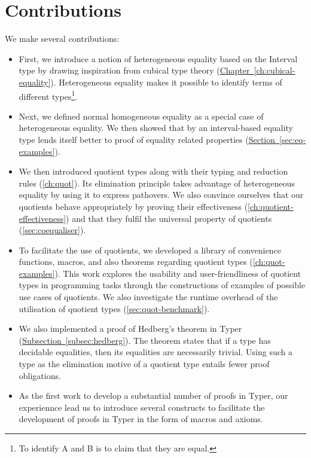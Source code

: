 \documentclass[12pt,twoside,maitrise]{dms}
\theoremstyle{definition}
\numberwithin{equation}{section}
\numberwithin{table}{chapter}
\numberwithin{figure}{chapter}
\begin{document}
\section{Contributions}

We make several contributions:

\begin{itemize}
  \item{First, we introduce a notion of heterogeneous equality based on the
    Interval type by drawing inspiration from cubical type theory
    (\hyperref[ch:cubical-equality]{Chapter~\ref*{ch:cubical-equality}}).
    Heterogeneous equality makes it possible to identify terms of different
    types\footnote{To identify A and B is to claim that they are equal.}. }

  \item{Next, we defined normal homogeneous equality as a special case of
    heterogeneous equality. We then showed that by an interval-based equality
    type lends itself better to proof of equality related properties
    (\hyperref[sec:eq-examples]{Section~\ref*{sec:eq-examples}}).}

  \item{We then introduced quotient types along with their typing and reduction
    rules (\autoref{ch:quot}). Its elimination principle takes advantage of
    heterogeneous equality by using it to express
    pathovers\cite{licata2015cubical}. We also convince ourselves that our
    quotients behave appropriately by proving their effectiveness
    (\autoref{ch:quotient-effectiveness}) and that they fulfil the universal
    property of quotients (\autoref{sec:coequaliser}). }

  \item{To facilitate the use of quotients, we developed a library of
    convenience functions, macros, and also theorems regarding quotient types
    (\autoref{ch:quot-examples}). This work explores the usability and
    user-friendliness of quotient types in programming tasks through the
    constructions of examples of possible use cases of quotients. We also
    investigate the runtime overhead of the utilisation of quotient types
    (\autoref{sec:quot-benchmark}).}

  \item{We also implemented a proof of Hedberg's
    theorem\cite{hedberg1998coherence} in Typer
    (\hyperref[subsec:hedberg]{Subsection~\ref*{subsec:hedberg}}). The theorem
    states that if a type has decidable equalities, then its equalities are
    necessarily trivial. Using such a type as the elimination motive of a
    quotient type entails fewer proof obligations. }

  \item{As the first work to develop a substantial number of proofs in Typer,
    our experiennce lead us to introduce several constructs to facilitate the
    development of proofs in Typer in the form of macros and axioms. }
\end{itemize}
\end{document}
